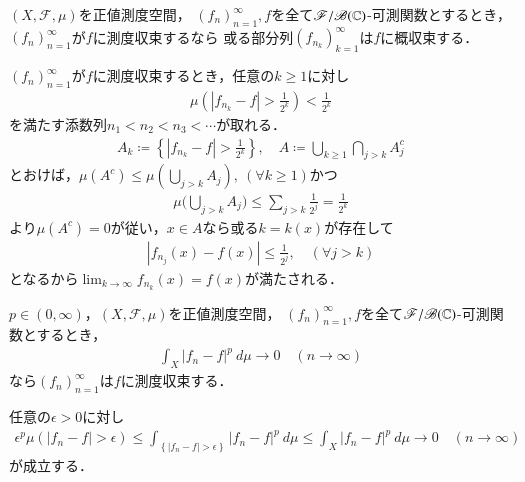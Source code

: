 		\begin{screen}
			\begin{thm}[測度収束列の概収束部分列]
				$(X,\mathscr{F},\mu)$を正値測度空間，
				$(f_n)_{n=1}^\infty,f$を全て$\mathscr{F}/\mathscr{B}(\mathbb{C})$-可測関数とするとき，
				$(f_n)_{n=1}^\infty$が$f$に測度収束するなら
				或る部分列$(f_{n_k})_{k=1}^\infty$は$f$に概収束する．
			\end{thm}
		\end{screen}
		
		\begin{prf}
			$(f_n)_{n=1}^\infty$が$f$に測度収束するとき，任意の$k \geq 1$に対し
			\begin{align}
				\mu\left( |f_{n_k} - f| > \frac{1}{2^k}\right) < \frac{1}{2^k}
			\end{align}
			を満たす添数列$n_1 < n_2 < n_3 < \cdots$が取れる．
			\begin{align}
				A_k \coloneqq \left\{|f_{n_k} - f| > \frac{1}{2^k}\right\},
				\quad A \coloneqq \bigcup_{k\geq1} \bigcap_{j>k} A_j^c
			\end{align}
			とおけば，$\mu(A^c) \leq \mu\left(\bigcup_{j>k} A_j\right),\ (\forall k \geq 1)$かつ
			\begin{align}
				\mu\Biggl(\bigcup_{j>k} A_j\Biggr) \leq \sum_{j>k} \frac{1}{2^j}
				= \frac{1}{2^k}
			\end{align}
			より$\mu(A^c) = 0$が従い，$x \in A$なら或る$k = k(x)$が存在して
			\begin{align}
				|f_{n_j}(x) - f(x)| \leq \frac{1}{2^j}, \quad (\forall j > k)
			\end{align}
			となるから$\lim_{k \to \infty} f_{n_k}(x) = f(x)$が満たされる．
			\QED
		\end{prf}
		
		\begin{screen}
			\begin{thm}[平均収束すれば測度収束する]
				$p \in (0,\infty)$，$(X,\mathscr{F},\mu)$を正値測度空間，
				$(f_n)_{n=1}^\infty,f$を全て$\mathscr{F}/\mathscr{B}(\mathbb{C})$-可測関数とするとき，
				\begin{align}
					\int_X |f_n - f|^p\ d\mu \longrightarrow 0
					\quad (n \longrightarrow \infty)
				\end{align}
				なら$(f_n)_{n=1}^\infty$は$f$に測度収束する．
			\end{thm}
		\end{screen}
		
		\begin{prf}
			任意の$\epsilon > 0$に対し
			\begin{align}
				\epsilon^p \mu\left(|f_n - f| > \epsilon\right)
				\leq \int_{\left\{|f_n - f| > \epsilon\right\}} |f_n-f|^p\ d\mu
				\leq \int_X |f_n - f|^p\ d\mu \longrightarrow 0
				\quad (n \longrightarrow \infty)
			\end{align}
			が成立する．
			\QED
		\end{prf}
		
